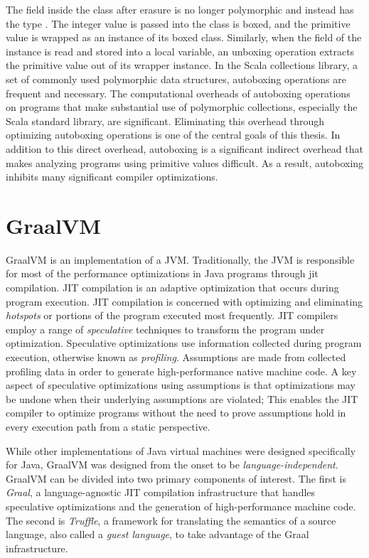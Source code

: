 The  field inside the  class after erasure is no longer polymorphic and instead has the type . 
The integer value  is passed into the  class is boxed, and the primitive value is wrapped as an instance of its boxed class.
Similarly, when the  field of the instance is read and stored into a local variable, an unboxing operation extracts the primitive value out of its wrapper instance.
In the Scala collections library, a set of commonly used polymorphic data structures, autoboxing operations are frequent and necessary.
The computational overheads of autoboxing operations on programs that make substantial use of polymorphic collections, especially the Scala standard library, are significant\cite{scala:collections-optimization}.
Eliminating this overhead through optimizing autoboxing operations is one of the central goals of this thesis.
In addition to this direct overhead, autoboxing is a significant indirect overhead that makes analyzing programs using primitive values difficult. As a result, autoboxing inhibits many significant compiler optimizations.

\section{GraalVM}

GraalVM\cite{java:graalvm} is an implementation of a JVM.
Traditionally, the JVM is responsible for most of the performance optimizations in Java programs\cite{java:hotspot} through \acrfull{jit} compilation.
JIT compilation is an adaptive optimization that occurs during program execution.
JIT compilation is concerned with optimizing and eliminating \textit{hotspots} or portions of the program executed most frequently.
JIT compilers\cite{java:sablevm,java:jikesrvm} employ a range of \textit{speculative} techniques to transform the program under optimization.
Speculative optimizations use information collected during program execution, otherwise known as \textit{profiling}. 
Assumptions are made from collected profiling data in order to generate high-performance native machine code.
A key aspect of speculative optimizations using assumptions is that optimizations may be undone when their underlying assumptions are violated; This enables the JIT compiler to optimize programs without the need to prove assumptions hold in every execution path from a static perspective.

While other implementations of Java virtual machines were designed specifically for Java, GraalVM was designed from the onset to be \textit{language-independent}.
GraalVM can be divided into two primary components of interest. 
The first is \textit{Graal}, a language-agnostic JIT compilation infrastructure that handles speculative optimizations and the generation of high-performance machine code.
The second is \textit{Truffle}, a framework for translating the semantics of a source language, also called a \textit{guest language}, to take advantage of the Graal infrastructure.

